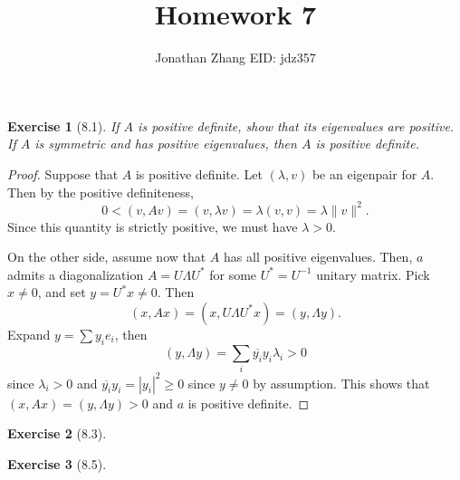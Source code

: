 \documentclass[letterpaper,twoside,11pt]{article}
\theoremstyle{mystyle}
\newtheorem*{exercise}{Exercise}
\newcommand{\inv}{^{-1}}
\begin{document}
\title{\vspace{-2\baselineskip} 
Homework 7
}
\author{Jonathan Zhang \qquad EID: { jdz357} }
\date{}
\maketitle



\begin{exercise}[8.1]
  If $A$ is positive definite, show that its eigenvalues are positive. If $A$ is symmetric and has positive eigenvalues, then $A$ is positive definite. 
\end{exercise}

\begin{proof}
  Suppose that $A$ is positive definite. Let $\left( \lambda, v \right)$ be an eigenpair for $A$. Then by the positive definiteness, 
    \[0<\left( v, Av \right) = \left( v, \lambda v \right) = \lambda \left( v, v \right) = \lambda \|v\|^2.\]
    Since this quantity is strictly positive, we must have $\lambda >0$. 

  On the other side, 
  assume now that $A$ has all positive eigenvalues. Then, $a$ admits a diagonalization $A= U \Lambda U^*$ for some $U^* = U\inv$ unitary matrix. Pick $x \neq 0$, and set $y = U^* x \neq 0$. Then 
    \[\left( x, Ax \right) = \left( x, U \Lambda U^* x \right) = \left( y, \Lambda y \right).\] 
    Expand $y = \sum y_i e_i$, then 
    \[\left( y, \Lambda y \right) = \sum_{i} \overline{y_i} y_i \lambda _i >0\] since $\lambda_i >0$ and $\overline{y_i}y_i = |y_i|^2 \geq 0 $ since $y \neq 0$ by assumption. This shows that $\left( x, Ax \right) = \left( y, \Lambda y \right) >0$ and $a$ is positive definite. 

\end{proof}






\newpage 
\begin{exercise}[8.3]

\end{exercise}





\newpage
\begin{exercise}[8.5]
\end{exercise}
\end{document}
